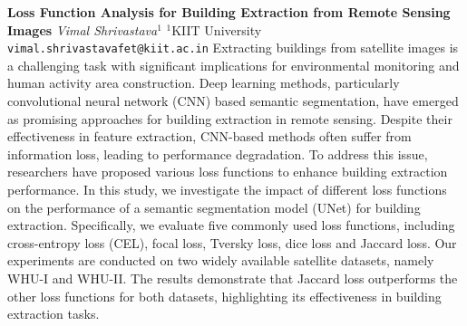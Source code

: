 
    \begin{conf-abstract}[]
        {\textbf{Loss Function Analysis for Building Extraction from Remote Sensing Images}}
        {\textit{Vimal  Shrivastava$^{1}$}}
        {$^{1}$KIIT University}
        {\texttt{vimal.shrivastavafet@kiit.ac.in}}
        {Extracting buildings from satellite images is a challenging task with significant implications for environmental monitoring and human activity area construction. Deep learning methods, particularly convolutional neural network (CNN) based semantic segmentation, have emerged as promising approaches for building extraction in remote sensing. Despite their effectiveness in feature extraction, CNN-based methods often suffer from information loss, leading to performance degradation. To address this issue, researchers have proposed various loss functions to enhance building extraction performance. In this study, we investigate the impact of different loss functions on the performance of a semantic segmentation model (UNet) for building extraction. Specifically, we evaluate five commonly used loss functions, including cross-entropy loss (CEL), focal loss, Tversky loss, dice loss and Jaccard loss. Our experiments are conducted on two widely available satellite datasets, namely WHU-I and WHU-II. The results demonstrate that Jaccard loss outperforms the other loss functions for both datasets, highlighting its effectiveness in building extraction tasks.}
    \end{conf-abstract}
        